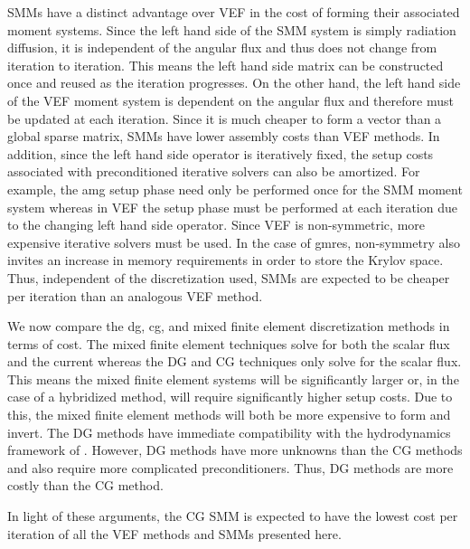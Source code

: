 \documentclass[../doc.tex]{subfiles}
\begin{document}
SMMs have a distinct advantage over VEF in the cost of forming their associated moment systems. Since the left hand side of the SMM system is simply radiation diffusion, it is independent of the angular flux and thus does not change from iteration to iteration. This means the left hand side matrix can be constructed once and reused as the iteration progresses. On the other hand, the left hand side of the VEF moment system is dependent on the angular flux and therefore must be updated at each iteration. Since it is much cheaper to form a vector than a global sparse matrix, SMMs have lower assembly costs than VEF methods. In addition, since the left hand side operator is iteratively fixed, the setup costs associated with preconditioned iterative solvers can also be amortized. For example, the \gls{amg} setup phase need only be performed once for the SMM moment system whereas in VEF the setup phase must be performed at each iteration due to the changing left hand side operator. 
Since VEF is non-symmetric, more expensive iterative solvers must be used. In the case of \gls{gmres}, non-symmetry also invites an increase in memory requirements in order to store the Krylov space. Thus, independent of the discretization used, SMMs are expected to be cheaper per iteration than an analogous VEF method. 

We now compare the \gls{dg}, \gls{cg}, and mixed finite element discretization methods in terms of cost. The mixed finite element techniques solve for both the scalar flux and the current whereas the DG and CG techniques only solve for the scalar flux. This means the mixed finite element systems will be significantly larger or, in the case of a hybridized method, will require significantly higher setup costs. Due to this, the mixed finite element methods will both be more expensive to form and invert. The DG methods have immediate compatibility with the hydrodynamics framework of \cite{blast}. However, DG methods have more unknowns than the CG methods and also require more complicated preconditioners. Thus, DG methods are more costly than the CG method. 

In light of these arguments, the CG SMM is expected to have the lowest cost per iteration of all the VEF methods and SMMs presented here. 
\end{document}
